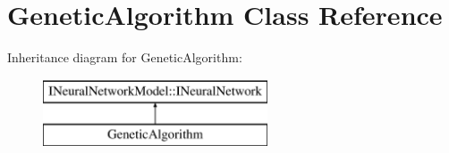 \hypertarget{class_genetic_algorithm}{}\section{Genetic\+Algorithm Class Reference}
\label{class_genetic_algorithm}
Inheritance diagram for Genetic\+Algorithm\+:\begin{figure}[H]
\begin{center}
\leavevmode
\includegraphics[height=2.000000cm]{class_genetic_algorithm}
\end{center}
\end{figure}
